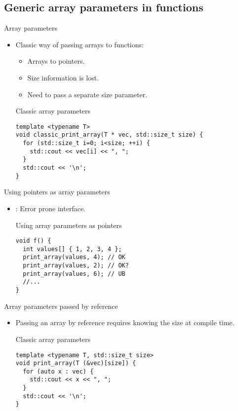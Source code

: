 \subsection{Generic array parameters in functions}

\begin{frame}[t,fragile]{Array parameters}
\begin{itemize}
  \item Classic way of passing arrays to functions:
    \begin{itemize}
      \item Arrays  to pointers.
      \item Size information is lost.
      \item Need to pass a separate size parameter.
    \end{itemize}

\begin{block}{Classic array parameters}
\begin{lstlisting}
template <typename T>
void classic_print_array(T * vec, std::size_t size) {
  for (std::size_t i=0; i<size; ++i) {
    std::cout << vec[i] << ", ";
  }
  std::cout << '\n';
}
\end{lstlisting}
\end{block}

\end{itemize}
\end{frame}

\begin{frame}[t,fragile]{Using pointers as array parameters}
\begin{itemize}
  \item {}: Error prone interface.

\begin{block}{Using array parameters as pointers}
\begin{lstlisting}
void f() {
  int values[] { 1, 2, 3, 4 };
  print_array(values, 4); // OK
  print_array(values, 2); // OK?
  print_array(values, 6); // UB
  //...
}
\end{lstlisting}
\end{block}

\end{itemize}
\end{frame}

\begin{frame}[t,fragile]{Array parameters passed by reference}
\begin{itemize}
  \item Passing an array by reference requires knowing the size
        at compile time.

\begin{block}{Classic array parameters}
\begin{lstlisting}
template <typename T, std::size_t size>
void print_array(T (&vec)[size]) {
  for (auto x : vec) {
    std::cout << x << ", ";
  }
  std::cout << '\n';
}
\end{lstlisting}
\end{block}

\end{itemize}
\end{frame}


